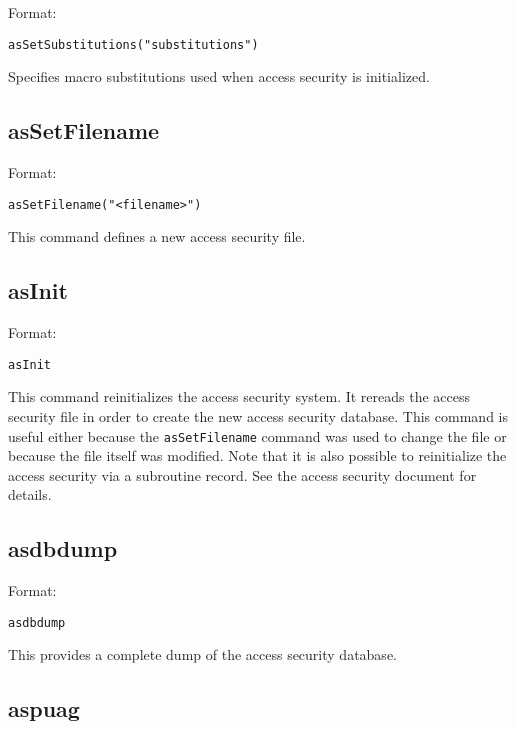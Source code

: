 Format:

\begin{verbatim}
asSetSubstitutions("substitutions")
\end{verbatim}

Specifies macro substitutions used when access security is initialized.

\subsection{asSetFilename}

Format:

\begin{verbatim}
asSetFilename("<filename>")
\end{verbatim}

This command defines a new access security file.

\subsection{asInit}

Format:

\begin{verbatim}
asInit
\end{verbatim}

This command reinitializes the access security system.  It rereads the access security file in order to create the new access 
security database. This command is useful either because the \verb|asSetFilename| command was used to change the file or 
because the file itself was modified.  Note that it is also possible to reinitialize the access security via a subroutine record.  
See the access security document for details.

\subsection{asdbdump}

Format:

\begin{verbatim}
asdbdump
\end{verbatim}

This provides a complete dump of the access security database.

\subsection{aspuag}

